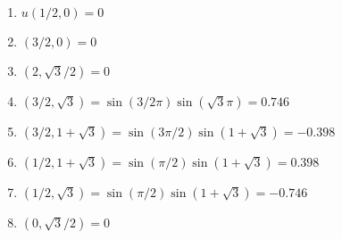 \documentclass{article}
\begin{document}
\begin{enumerate}
    \item $u(1/2,0) = 0$
    \item $(3/2,0) = 0$
    \item $(2,\sqrt{3}/2) = 0$
    \item $(3/2,\sqrt{3}) = \sin(3/2\pi)\sin(\sqrt{3}\pi) = 0.746$
    \item $(3/2,1+\sqrt{3}) = \sin({3\pi/2})\sin(1+\sqrt{3}) = -0.398$
    \item $(1/2,1+\sqrt{3}) = \sin(\pi/2)\sin(1+\sqrt{3}) = 0.398$
    \item $(1/2,\sqrt{3}) = \sin(\pi/2)\sin(1+\sqrt{3}) = -0.746$
    \item $(0, \sqrt{3}/2) = 0$
\end{enumerate}
\end{document}
